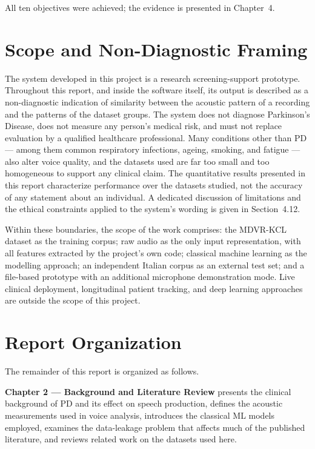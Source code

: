 All ten objectives were achieved; the evidence is presented in
Chapter~4.

\section{Scope and Non-Diagnostic Framing}

The system developed in this project is a research screening-support
prototype. Throughout this report, and inside the software itself, its
output is described as a non-diagnostic indication of similarity
between the acoustic pattern of a recording and the patterns of the
dataset groups. The system does not diagnose Parkinson's Disease, does
not measure any person's medical risk, and must not replace evaluation
by a qualified healthcare professional. Many conditions other than PD
--- among them common respiratory infections, ageing, smoking, and
fatigue --- also alter voice quality, and the datasets used are far too
small and too homogeneous to support any clinical claim. The
quantitative results presented in this report characterize performance
over the datasets studied, not the accuracy of any statement about an
individual. A dedicated discussion of limitations and the ethical
constraints applied to the system's wording is given in
Section~4.12.

Within these boundaries, the scope of the work comprises: the MDVR-KCL
dataset as the training corpus; raw audio as the only input
representation, with all features extracted by the project's own code;
classical machine learning as the modelling approach; an independent
Italian corpus as an external test set; and a file-based prototype with
an additional microphone demonstration mode. Live clinical deployment,
longitudinal patient tracking, and deep learning approaches are outside
the scope of this project.

\section{Report Organization}

The remainder of this report is organized as follows.

\textbf{Chapter 2 --- Background and Literature Review} presents the
clinical background of PD and its effect on speech production, defines
the acoustic measurements used in voice analysis, introduces the
classical ML models employed, examines the data-leakage problem that
affects much of the published literature, and reviews related work on
the datasets used here.

